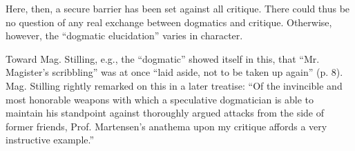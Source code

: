 \documentclass[12pt,a4paper]{book}
\begin{document}
Here, then, a secure barrier has been set against all critique.
There could thus be no question of any real exchange
between dogmatics and critique. Otherwise, however, the
``dogmatic elucidation'' varies in character.

Toward Mag. Stilling, e.g., the ``dogmatic'' showed itself
in this, that ``Mr. Magister's scribbling'' was at once ``laid aside, not
to be taken up again'' (p. 8). Mag. Stilling rightly remarked
on this in a later treatise: ``Of the invincible and
most honorable weapons with which a speculative dogmatician is able to
maintain his standpoint against thoroughly argued attacks
from the side of former friends, Prof. Martensen's
anathema upon my critique affords a very instructive example.''
\end{document}

